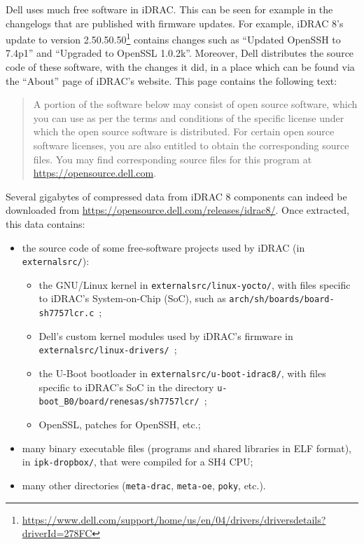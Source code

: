Dell uses much free software in iDRAC.
This can be seen for example in the changelogs that are published with firmware updates.
For example, iDRAC 8's update to version 2.50.50.50\footnote{\url{https://www.dell.com/support/home/us/en/04/drivers/driversdetails?driverId=278FC}} contains changes such as ``Updated OpenSSH to 7.4p1'' and ``Upgraded to OpenSSL 1.0.2k''.
Moreover, Dell distributes the source code of these software, with the changes it did, in a place which can be found via the ``About'' page of iDRAC's website.
This page contains the following text:

\begin{quote}
  \footnotesize
  A portion of the software below may consist of open source software, which you can use as per the terms and conditions of the specific license under which the open source software is distributed.
  For certain open source software licenses, you are also entitled to obtain the corresponding source files.
  You may find corresponding source files for this program at \url{https://opensource.dell.com}.
\end{quote}

Several gigabytes of compressed data from iDRAC 8 components can indeed be downloaded from \url{https://opensource.dell.com/releases/idrac8/}.
Once extracted, this data contains:
\begin{itemize}
  \item the source code of some free-software projects used by iDRAC (in \texttt{externalsrc/}):
    \begin{itemize}
      \item the GNU/Linux kernel in \texttt{externalsrc/linux-yocto/}, with files specific to iDRAC's System-on-Chip (SoC), such as \texttt{arch/sh/boards/board-sh7757lcr.c}~;
      \item Dell's custom kernel modules used by iDRAC's firmware in \texttt{externalsrc/linux-drivers/}~;
      \item the U-Boot bootloader in \texttt{externalsrc/u-boot-idrac8/}, with files specific to iDRAC's SoC in the directory \texttt{u-boot\_B0/board/renesas/sh7757lcr/}~;
      \item OpenSSL, patches for OpenSSH, etc.;
    \end{itemize}
  \item many binary executable files (programs and shared libraries in ELF format), in \texttt{ipk-dropbox/}, that were compiled for a SH4 CPU;
  \item many other directories (\texttt{meta-drac}, \texttt{meta-oe}, \texttt{poky}, etc.).
\end{itemize}

